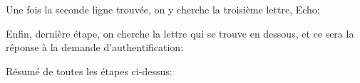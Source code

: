 \begin{e1}
	
	\item Une fois la seconde ligne trouvée, on y cherche la troisième lettre, Echo:
	
	
	\item Enfin, dernière étape, on cherche la lettre qui se trouve en dessous, et ce sera la réponse à la demande d'authentification:
	
	
	\item Résumé de toutes les étapes ci-dessus:
	
	
\end{e1}

\newpage


